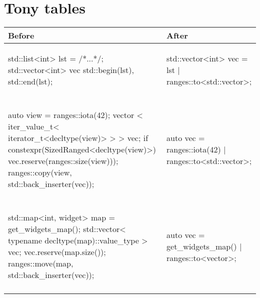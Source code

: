 \documentclass{wg21}
\begin{document}
\section{Tony tables}
\begin{center}
\begin{tabular}{l|l}
Before & After\\ \hline
\begin{minipage}[t]{0.5\textwidth}
\begin{colorblock}
std::list<int> lst = /*...*/;
std::vector<int> vec
	{std::begin(lst), std::end(lst)};
\end{colorblock}
\end{minipage}
&
\begin{minipage}[t]{0.5\textwidth}
\begin{colorblock}
std::vector<int> vec = lst | ranges::to<std::vector>;
\end{colorblock}
\end{minipage}
\\\\ \hline

\begin{minipage}[t]{0.5\textwidth}
\begin{colorblock}
auto view = ranges::iota(42);
vector <
  iter_value_t<
	iterator_t<decltype(view)>
  >
> vec;
if constexpr(SizedRanged<decltype(view)>) {
  vec.reserve(ranges::size(view)));
}
ranges::copy(view, std::back_inserter(vec));
\end{colorblock}
\end{minipage}
&
\begin{minipage}[t]{0.5\textwidth}
\begin{colorblock}
auto vec = ranges::iota(42)
	| ranges::to<std::vector>;
\end{colorblock}
\end{minipage}
\\\\ \hline


\begin{minipage}[t]{0.5\textwidth}
\begin{colorblock}
std::map<int, widget> map = get_widgets_map();
std::vector<
  typename decltype(map)::value_type
> vec;
vec.reserve(map.size());
ranges::move(map, std::back_inserter(vec));
\end{colorblock}
\end{minipage}
&
\begin{minipage}[t]{0.5\textwidth}
\begin{colorblock}
auto vec = get_widgets_map()
          | ranges::to<vector>;
\end{colorblock}
\end{minipage}
\\\\ \hline

\end{tabular}
\end{center}
\end{document}
